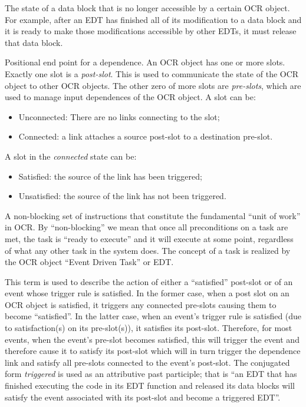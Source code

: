\glossarydefstart
The state of a data block that is no longer accessible by a certain OCR
object. For example, after an EDT has finished all of its
modification to a data block and it is ready to make those
modifications accessible by other EDTs, it must release that data
block.
\glossarydefend

\glossarydefstart
Positional end point for a dependence. An OCR object has one or more
slots. Exactly one slot is a \emph{post-slot}. This is used to
communicate the state of the OCR object to other OCR objects. The
other zero of more slots are \emph{pre-slots}, which are used to manage
input dependences of the OCR object. A slot can be:
\begin{itemize}
\item Unconnected: There are no links connecting to the slot;
\item Connected: a link attaches a source post-slot to a destination pre-slot.
\end{itemize}
A slot in the \emph{connected} state can be:
\begin{itemize}
\item Satisfied: the source of the link has been triggered;
\item Unsatisfied: the source of the link has not been triggered.
\end{itemize}
\glossarydefend

\glossarydefstart
A non-blocking set of instructions that constitute the fundamental
``unit of work'' in OCR.  By ``non-blocking'' we mean that once all
preconditions on a task are met, the task is ``ready to execute'' 
and it will execute at some point,
regardless of what any other task in the system does. The concept of
a task is realized by the OCR object ``Event Driven Task'' or EDT.
\glossarydefend

\glossarydefstart
This term is used to describe the action of either a ``satisfied''
post-slot or of an event whose trigger rule is satisfied. In the
former case, when a post slot on
an OCR object is satisfied, it triggers any connected
pre-slots causing them to become ``satisfied''. In the latter case,
when an event's trigger rule is satisfied (due to satisfaction(s) on its
pre-slot(s)), it satisfies its post-slot. Therefore, for most events,
when the event's pre-slot becomes satisfied, this will trigger the event and
therefore cause it to satisfy its post-slot which will in turn trigger
the dependence link and satisfy all pre-slots connected to the event's
post-slot. The conjugated form \emph{triggered} is used as an
attributive past participle; that is
``an EDT that has finished executing the code in its EDT function and  
released its data blocks will satisfy the event associated
with its post-slot and become a triggered EDT''.
\glossarydefend


